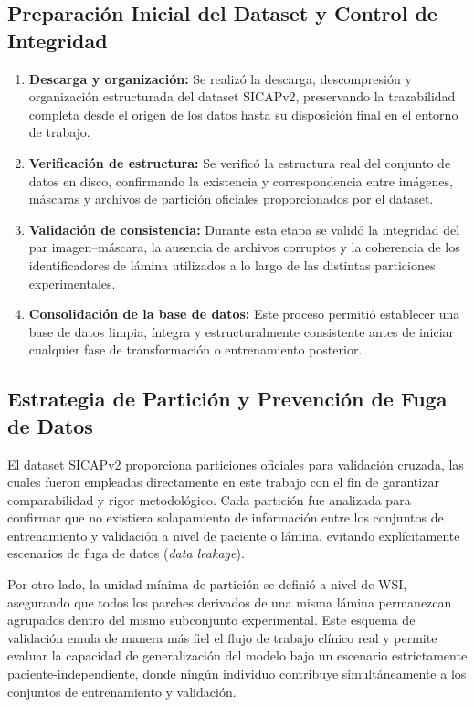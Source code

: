\subsection{Preparación Inicial del Dataset y Control de Integridad}
\label{subsec:preparacion_dataset}
\begin{enumerate}
    \item \textbf{Descarga y organización:} Se realizó la descarga, descompresión y organización estructurada del dataset SICAPv2, preservando la trazabilidad completa desde el origen de los datos hasta su disposición final en el entorno de trabajo.
    
    \item \textbf{Verificación de estructura:} Se verificó la estructura real del conjunto de datos en disco, confirmando la existencia y correspondencia entre imágenes, máscaras y archivos de partición oficiales proporcionados por el dataset.
    
    \item \textbf{Validación de consistencia:} Durante esta etapa se validó la integridad del par imagen--máscara, la ausencia de archivos corruptos y la coherencia de los identificadores de lámina utilizados a lo largo de las distintas particiones experimentales.
    
    \item \textbf{Consolidación de la base de datos:} Este proceso permitió establecer una base de datos limpia, íntegra y estructuralmente consistente antes de iniciar cualquier fase de transformación o entrenamiento posterior.
\end{enumerate}

\subsection{Estrategia de Partición y Prevención de Fuga de Datos}
\label{subsec:particiones_validacion}
El dataset SICAPv2 proporciona particiones oficiales para validación cruzada, las cuales fueron empleadas directamente en este trabajo con el fin de garantizar comparabilidad y rigor metodológico. Cada partición fue analizada para confirmar que no existiera solapamiento de información entre los conjuntos de entrenamiento y validación a nivel de paciente o lámina, evitando explícitamente escenarios de fuga de datos (\textit{data leakage}).\newline

Por otro lado, la unidad mínima de partición se definió a nivel de WSI, asegurando que todos los parches derivados de una misma lámina permanezcan agrupados dentro del mismo subconjunto experimental. Este esquema de validación emula de manera más fiel el flujo de trabajo clínico real y permite evaluar la capacidad de generalización del modelo bajo un escenario estrictamente paciente-independiente, donde ningún individuo contribuye simultáneamente a los conjuntos de entrenamiento y validación.

